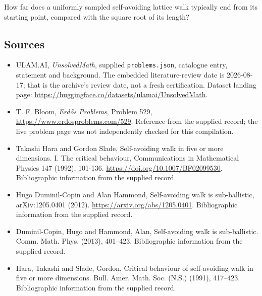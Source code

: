 \documentclass[11pt,a4paper]{article}
\begin{document}
How far does a uniformly sampled self-avoiding lattice walk typically end from its starting point, compared with the square root of its length?

\subsection{Sources}

{\small

\begin{itemize}

\item[\hypertarget{source:statement:1}{S1}] ULAM.AI, \emph{UnsolvedMath}, supplied \texttt{problems.json}, catalogue entry, statement and background. The embedded literature-review date is 2026-08-17; that is the archive’s review date, not a fresh certification. Dataset landing page: \url{https://huggingface.co/datasets/ulamai/UnsolvedMath}.

\item[\hypertarget{source:statement:2}{S2}] T. F. Bloom, \emph{Erdős Problems}, Problem 529, \url{https://www.erdosproblems.com/529}. Reference from the supplied record; the live problem page was not independently checked for this compilation.

\item[\hypertarget{source:statement:3}{S3}] Takashi Hara and Gordon Slade, Self-avoiding walk in five or more dimensions. I. The critical behaviour, Communications in Mathematical Physics 147 (1992), 101-136. \url{https://doi.org/10.1007/BF02099530}. Bibliographic information from the supplied record.

\item[\hypertarget{source:statement:4}{S4}] Hugo Duminil-Copin and Alan Hammond, Self-avoiding walk is sub-ballistic, arXiv:1205.0401 (2012). \url{https://arxiv.org/abs/1205.0401}. Bibliographic information from the supplied record.

\item[\hypertarget{source:statement:5}{S5}] Duminil-Copin, Hugo and Hammond, Alan, Self-avoiding walk is sub-ballistic. Comm. Math. Phys. (2013), 401--423. Bibliographic information from the supplied record.

\item[\hypertarget{source:statement:6}{S6}] Hara, Takashi and Slade, Gordon, Critical behaviour of self-avoiding walk in five or more dimensions. Bull. Amer. Math. Soc. (N.S.) (1991), 417--423. Bibliographic information from the supplied record.

\end{itemize}

}

\label{end:statement}
\end{document}
